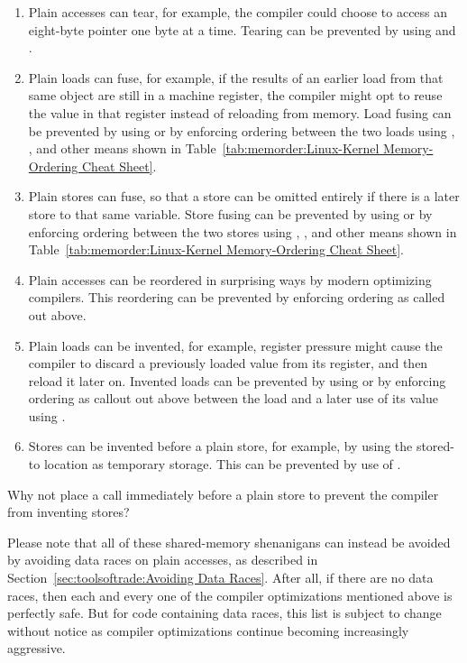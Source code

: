 \begin{enumerate}
\item	Plain accesses can tear, for example, the compiler could choose
	to access an eight-byte pointer one byte at a time.
	Tearing can be prevented by using  and
	.
\item	Plain loads can fuse, for example, if the results of an earlier
	load from that same object are still in a machine register,
	the compiler might opt to reuse the value in that register
	instead of reloading from memory.
	Load fusing can be prevented by using  or by
	enforcing ordering between the two loads using ,
	, and other means shown in
	Table~\ref{tab:memorder:Linux-Kernel Memory-Ordering Cheat Sheet}.
\item	Plain stores can fuse, so that a store can be omitted entirely
	if there is a later store to that same variable.
	Store fusing can be prevented by using  or by
	enforcing ordering between the two stores using ,
	, and other means shown in
	Table~\ref{tab:memorder:Linux-Kernel Memory-Ordering Cheat Sheet}.
\item	Plain accesses can be reordered in surprising ways by modern
	optimizing compilers.
	This reordering can be prevented by enforcing ordering as
	called out above.
\item	Plain loads can be invented, for example, register pressure might
	cause the compiler to discard a previously loaded value from
	its register, and then reload it later on.
	Invented loads can be prevented by using  or by
	enforcing ordering as callout out above between the load and a
	later use of its value using .
\item	Stores can be invented before a plain store, for example, by
	using the stored-to location as temporary storage.
	This can be prevented by use of .
\end{enumerate}

\QuickQuiz{}
	Why not place a  call immediately before
	a plain store to prevent the compiler from inventing stores?
 \QuickQuizEnd

Please note that all of these shared-memory shenanigans can instead be
avoided by avoiding data races on plain accesses, as described in
Section~\ref{sec:toolsoftrade:Avoiding Data Races}.
After all, if there are no data races, then each and every one of the
compiler optimizations mentioned above is perfectly safe.
But for code containing data races, this list is subject to change
without notice as compiler optimizations continue becoming increasingly
aggressive.

